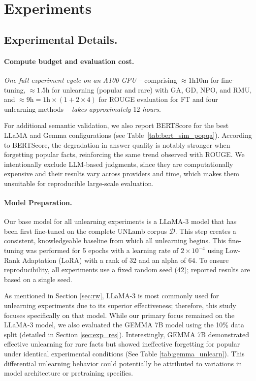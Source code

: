 \documentclass[11pt]{article}
\begin{document}
{\section{Experiments}

\subsection{Experimental Details.}
\label{sec:experiments}

\paragraph{Compute budget and evaluation cost.}
\textit{One full experiment cycle on an A100 GPU} -- comprising $\approx1\text{h}10\text{m}$ for fine-tuning, $\approx1.5\text{h}$ for unlearning (popular and rare) with GA, GD, NPO, and RMU, and $\approx9\text{h}=1\text{h}\times\left(1+2\times4\right)$ for ROUGE evaluation for FT and four unlearning methods -- \textit{takes approximately $12$ hours}.

For additional semantic validation, we also report BERTScore for the best LLaMA and Gemma configurations (see Table~\ref{tab:bert_sim_popqa}). 
According to BERTScore, the degradation in answer quality is notably stronger when forgetting popular facts, reinforcing the same trend observed with ROUGE. 
We intentionally exclude LLM-based judgments, since they are computationally expensive and their results vary across providers and time, which makes them unsuitable for reproducible large-scale evaluation.



\paragraph{Model Preparation.}
Our base model for all unlearning experiments is a LLaMA-3 model that has been first fine-tuned on the complete UNLamb corpus $\mathcal{D}$. This step creates a consistent, knowledgeable baseline from which all unlearning begins. This fine-tuning was performed for 5 epochs with a learning rate of $2 \times 10^{-4}$ using Low-Rank Adaptation (LoRA) with a rank of 32 and an alpha of 64. 
To ensure reproducibility, all experiments use a fixed random seed (42); reported results are based on a single seed.

As mentioned in Section \ref{sec:rw}, LLaMA-3 is most commonly used for unlearning experiments due to its superior effectiveness; therefore, this study focuses specifically on that model. While our primary focus remained on the LLaMA-3 model, we also evaluated the GEMMA 7B model using the 10\% data split (detailed in Section \ref{sec:exp_res}). Interestingly, GEMMA 7B demonstrated effective unlearning for rare facts but showed ineffective forgetting for popular under identical experimental conditions (See Table \ref{tab:gemma_unlearn}). This differential unlearning behavior could potentially be attributed to variations in model architecture or pretraining specifics.


}
\end{document}
